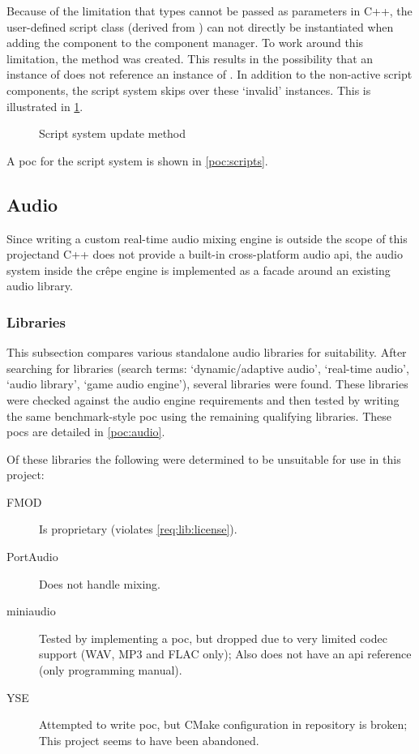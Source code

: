 \documentclass{projdoc}
\begin{document}
Because of the limitation that types cannot be passed as parameters in C++, the
user-defined script class (derived from ) can not directly be
instantiated when adding the component to the component manager. To work around this
limitation, the method  was created. This
results in the possibility that an instance of  does not
reference an instance of . In addition to the non-active script
components, the script system skips over these `invalid' instances. This is
illustrated in \cref{fig:activity-scripts}.

\begin{figure}
	\centering
	\caption{Script system update method}
	\label{fig:activity-scripts}
\end{figure}

A \gls{poc} for the script system is shown in \cref{poc:scripts}.

\subsection{Audio}

Since writing a custom real-time audio mixing engine is outside the scope of this
project\mref and C++ does not provide a built-in cross-platform audio \gls{api}, the
audio system inside the cr\^epe engine is implemented as a \gls{facade} around an
existing audio library.

\subsubsection{Libraries}
\label{sec:audio:libs}

This subsection compares various standalone audio libraries for suitability. After
searching for libraries (search terms: `dynamic/adaptive audio', `real-time audio',
`audio library', `game audio engine'), several libraries were found. These libraries
were checked against the audio engine requirements \autocite{crepe:requirements} and
then tested by writing the same benchmark-style \gls{poc} using the remaining
qualifying libraries. These \glspl{poc} are detailed in \cref{poc:audio}.

Of these libraries the following were determined to be unsuitable for use in this
project:\noparbreak
\begin{description}
	\item[FMOD \autocite{lib:fmod}] Is proprietary (violates \cref{req:lib:license}).
	\item[PortAudio \autocite{lib:portaudio}] Does not handle mixing.
	\item[miniaudio \autocite{lib:miniaudio}] Tested by implementing a \gls{poc}, but
		dropped due to very limited codec support (WAV, MP3 and FLAC only); Also does not
		have an \gls{api} reference (only programming manual).
	\item[YSE \autocite{lib:yse}] Attempted to write \gls{poc}, but CMake configuration
		in repository is broken; This project seems to have been abandoned.
\end{description}
\end{document}
